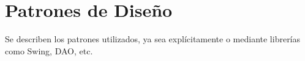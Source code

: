 \section*{Patrones de Diseño}

Se describen los patrones utilizados, ya sea explícitamente o mediante librerías como Swing, DAO, etc.
